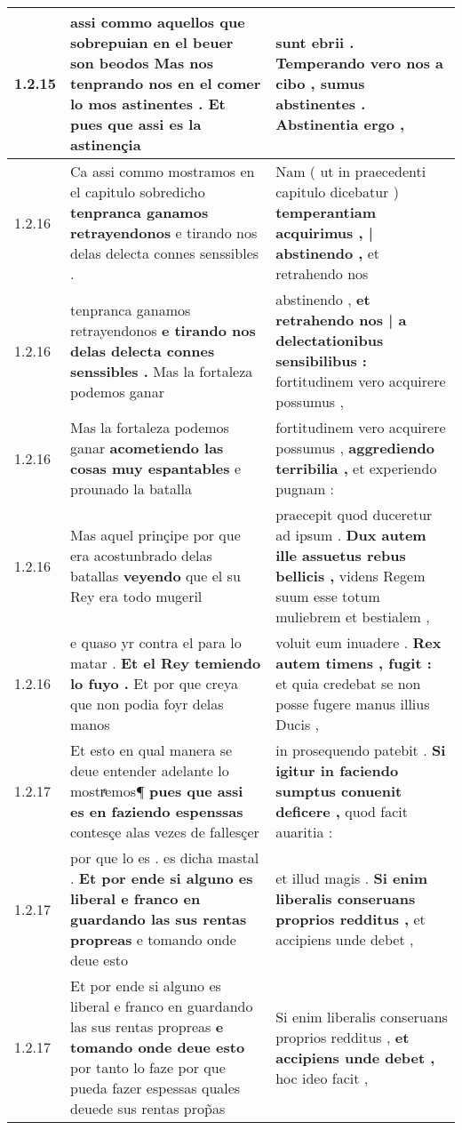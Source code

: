 \begin{tabular}{|p{1cm}|p{6.5cm}|p{6.5cm}|}
1.2.15 & assi commo aquellos que sobrepuian en el beuer son beodos \textbf{ Mas nos tenprando nos en el comer lo mos astinentes . } Et pues que assi es la astinençia & sunt ebrii . \textbf{ Temperando vero nos a cibo , } sumus abstinentes . Abstinentia ergo , \\\hline
1.2.16 & Ca assi commo mostramos en el capitulo sobredicho \textbf{ tenpranca ganamos retrayendonos } e tirando nos delas delecta connes senssibles . & Nam ( ut in praecedenti capitulo dicebatur ) \textbf{ temperantiam acquirimus , | abstinendo , } et retrahendo nos \\\hline
1.2.16 & tenpranca ganamos retrayendonos \textbf{ e tirando nos delas delecta connes senssibles . } Mas la fortaleza podemos ganar & abstinendo , \textbf{ et retrahendo nos | a delectationibus sensibilibus : } fortitudinem vero acquirere possumus , \\\hline
1.2.16 & Mas la fortaleza podemos ganar \textbf{ acometiendo las cosas muy espantables } e prounado la batalla & fortitudinem vero acquirere possumus , \textbf{ aggrediendo terribilia , } et experiendo pugnam : \\\hline
1.2.16 & Mas aquel prinçipe por que era acostunbrado delas batallas \textbf{ veyendo } que el su Rey era todo mugeril & praecepit quod duceretur ad ipsum . \textbf{ Dux autem ille assuetus rebus bellicis , } videns Regem suum esse totum muliebrem et bestialem , \\\hline
1.2.16 & e quaso yr contra el para lo matar . \textbf{ Et el Rey temiendo lo fuyo . } Et por que creya que non podia foyr delas manos & voluit eum inuadere . \textbf{ Rex autem timens , fugit : } et quia credebat se non posse fugere manus illius Ducis , \\\hline
1.2.17 & Et esto en qual manera se deue entender adelante lo mostrͣemos¶ \textbf{ pues que assi es en faziendo espenssas } contesçe alas vezes de fallesçer & in prosequendo patebit . \textbf{ Si igitur in faciendo sumptus conuenit deficere , } quod facit auaritia : \\\hline
1.2.17 & por que lo es . es dicha mastal . \textbf{ Et por ende si alguno es liberal e franco en guardando las sus rentas propreas } e tomando onde deue esto & et illud magis . \textbf{ Si enim liberalis conseruans proprios redditus , } et accipiens unde debet , \\\hline
1.2.17 & Et por ende si alguno es liberal e franco en guardando las sus rentas propreas \textbf{ e tomando onde deue esto } por tanto lo faze por que pueda fazer espessas quales deuede sus rentas prop̃as & Si enim liberalis conseruans proprios redditus , \textbf{ et accipiens unde debet , } hoc ideo facit , \\\hline

\end{tabular}
